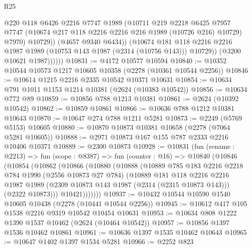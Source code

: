\begin{lexlean}{R25}
\begin{coremodule}
                      @220
                      @118
                      @6426
                      @2216
                      @7747
                      @1989
                      (@10711
                        @219
                        @2218
                        @6425
                        @7957
                        @7747
                        (@10674 @217 @118 @2216 @2216 @216 @1989 (@10726 @216) @10729)
                        @7970)
                      @10729))
                  (@4657 @9340 @6434))
                (@10674
                  @181
                  @118
                  @2216
                  @2216
                  @1987
                  @1989
                  (@10753 @143 @1987 (@2314 (@10756 @143)))
                  @10729))
              (@3200 @10621 @1987))))))
@10831 := @4172 @10577 @10594
@10840 := @10352 @10544 @10573 @1217 @10605 @10358 (@2278 (@10361 @10544 @2256))
@10846 := @10614 @1215 @2216 @2335 @10542 @10371 @10631
@10854 := @10634 @791 @1011 @1153 @1214 @10381 (@2624 (@10383 @10542))
@10856 := @10634 @772 @89
@10859 := @10856 @788 @1213 @10381
@10861 := @2624 (@10392 @10542)
@10862 := @10859 @10861
@10866 := @10636 @788 @1212 @10381 @10643
@10870 := @10647 @274 @788 @1211 @5281
@10873 := @2249 (@5769 @5153) @10605
@10880 := @10870 @10873 @10381 @10658 (@2278 (@7064 @5281 @10605))
@10888 := @2971 @10873 @167 @155 @787 @2333 @2216 @10406 @10371
@10889 := @2300 @10873
@10928 := @10831
    (fun (rename : @2213) =>
    fun (scope : @8387) =>
    fun (counter : @16) =>
    @10840
      (@10846
        (@10854
          (@10862
            (@10866
              (@10880
                (@10888
                  (@10889
                    @785
                    @183
                    @2216
                    @2218
                    @784
                    @1990
                    (@2556 @10873 @27 @784)
                    (@10889
                      @181
                      @118
                      @2216
                      @2216
                      @1987
                      @1989
                      (@2309 @10873 @143 @1987 (@2314 (@2315 @10873 @143)))
                      (@2322 @10873)))
                  @10421)))))))
@10937 := @10432 @10544 @10590 @1540 @10605 @10438 (@2278 (@10441 @10544 @2256))
@10945 := @10612 @417 @105 @1538 @2216 @9319 @10542 @10454 @10631
@10953 := @10634 @808 @1222 @1390 @1537 @10462 (@2624 (@10464 @10542))
@10957 := @10856 @1397 @1536 @10462 @10861
@10961 := @10636 @1397 @1535 @10462 @10643
@10965 := @10647 @1402 @1397 @1534 @5281
@10966 := @2252 @823

\end{coremodule}
\end{lexlean}
